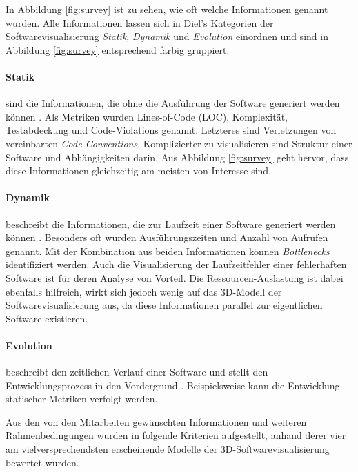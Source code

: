 In Abbildung \ref{fig:survey} ist zu sehen, wie oft welche Informationen genannt wurden. Alle Informationen lassen sich in Diel's Kategorien der Softwarevisualisierung \cite{diehl2007software} \textit{Statik}, \textit{Dynamik} und \textit{Evolution} einordnen und sind in Abbildung \ref{fig:survey} entsprechend farbig gruppiert.

\paragraph{Statik} sind die Informationen, die ohne die Ausführung der Software generiert werden können \cite{diehl2007software}. Als Metriken wurden Lines-of-Code (LOC), Komplexität, Testabdeckung und Code-Violations genannt. Letzteres sind Verletzungen von vereinbarten \emph{Code-Conventions}. Komplizierter zu visualisieren sind Struktur einer Software und Abhängigkeiten darin. Aus Abbildung \ref{fig:survey} geht hervor, dass diese Informationen gleichzeitig am meisten von Interesse sind.

\paragraph{Dynamik} beschreibt die Informationen, die zur Laufzeit einer Software generiert werden können \cite{diehl2007software}. Besonders oft wurden Ausführungszeiten und Anzahl von Aufrufen genannt. Mit der Kombination aus beiden Informationen können \emph{Bottlenecks} identifiziert werden. Auch die Visualisierung der Laufzeitfehler einer fehlerhaften Software ist für deren Analyse von Vorteil. Die Ressourcen-Auslastung ist dabei ebenfalls hilfreich, wirkt sich jedoch wenig auf das 3D-Modell der Softwarevisualisierung aus, da diese Informationen parallel zur eigentlichen Software existieren.

\paragraph{Evolution} beschreibt den zeitlichen Verlauf einer Software und stellt den Entwicklungsprozess in den Vordergrund \cite{diehl2007software}. Beispielsweise kann die Entwicklung statischer Metriken verfolgt werden.

Aus den von den Mitarbeiten gewünschten Informationen und weiteren Rahmenbedingungen wurden in \cite{puetz2017softwarevisualisierung} folgende Kriterien aufgestellt, anhand derer vier am vielversprechendsten erscheinende Modelle der 3D-Softwarevisualisierung bewertet wurden.

